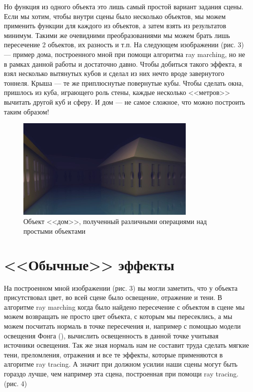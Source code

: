 \documentclass[14pt]{matmex-diploma}
\begin{document}
Но функция из одного объекта это лишь самый простой вариант задания сцены. 
Если мы хотим, чтобы внутри сцены было несколько объектов, мы можем применить функции для каждого из объектов, а затем взять из результатов минимум.
Такими же очевидними преобразованиями мы можем брать лишь пересечение 2 объектов, их разность и т.п. На следующем изображении (рис. 3) --- пример дома,
построенного мной при помощи алгоритма ray marching, но не в рамках данной работы и достаточно давно. Чтобы добиться такого эффекта,
я взял несколько вытянутых кубов и сделал из них нечто вроде завернутого тоннеля. Крыша --- те же приплюснутые повернутые кубы. Чтобы сделать окна,
пришлось из куба, играющего роль стены, каждые несколько <<метров>> вычитать другой куб и сферу. И дом --- не самое сложное, что можно построить таким образом!

\begin{figure}[h]
\label{house}
\centering
\includegraphics[width = 250pt]{house.jpg}
\caption{Объект <<дом>>, полученный различными операциями над простыми объектами}
\end{figure}

\section{<<Обычные>> эффекты}

На построенном мной изображении (рис. 3) вы могли заметить, что у объекта присутствовал цвет, во всей сцене было освещение, отражение и тени.
В алгоритме ray marching когда было найдено пересечение с объектом в сцене мы можем возвращать не просто цвет объекта, с которым мы пересеклись,
а мы можем посчитать нормаль в точке пересечения и, например с помощью модели освещения Фонга (\cite{wiki:fong}), вычислить освещенность в данной
точке учитывая источники освещения. Так же зная нормаль нам не составит труда сделать мягкие тени, преломления, отражения и все те эффекты,
которые применяются в алгоритме ray tracing. А значит при должном усилии наши сцены могут быть гораздо лучше, чем например эта сцена, построенная
при помощи ray tracing. (рис. 4)
\end{document}
